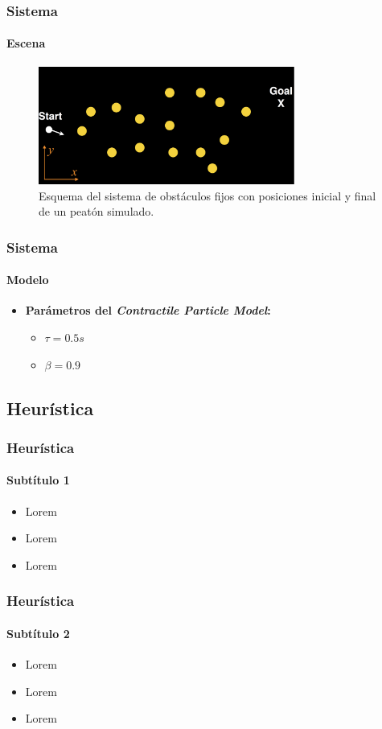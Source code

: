 \documentclass[hyperref={pdfpagelayout=SinglePage}]{beamer}
\begin{document}
\begin{frame}
\frametitle{Sistema}
\framesubtitle{Escena}
\begin{figure}[H]
	\centering
    \includegraphics[width=0.75\textwidth]{images/scene.png}
    \caption{Esquema del sistema de obstáculos fijos con posiciones inicial y final de un peatón simulado.}
\end{figure}
\end{frame}

\begin{frame}
\frametitle{Sistema}
\framesubtitle{Modelo}
\begin{itemize}
	\item \textbf{Parámetros del \textit{Contractile Particle Model}:}
	\begin{itemize}
		\item $\tau = 0.5s$
		\item $\beta = 0.9$
	\end{itemize}
\end{itemize}
\end{frame}

\subsection{Heurística}

\begin{frame}
\frametitle{Heurística}
\framesubtitle{Subtítulo 1}
\begin{itemize}
	\item Lorem
	\item Lorem
	\item Lorem
\end{itemize}
\end{frame}

\begin{frame}
\frametitle{Heurística}
\framesubtitle{Subtítulo 2}
\begin{itemize}
	\item Lorem
	\item Lorem
	\item Lorem
\end{itemize}
\end{frame}
\end{document}
